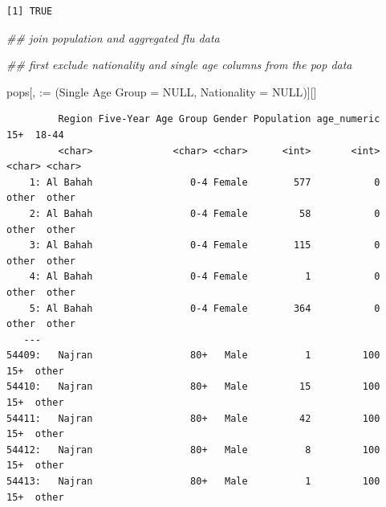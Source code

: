 \documentclass[
  letterpaper,
  DIV=11,
  numbers=noendperiod]{scrreprt}
\newenvironment{Shaded}{\begin{snugshade}}{\end{snugshade}}
\newcommand{\AttributeTok}[1]{\textcolor[rgb]{0.40,0.45,0.13}{#1}}
\newcommand{\ConstantTok}[1]{\textcolor[rgb]{0.56,0.35,0.01}{#1}}
\newcommand{\DocumentationTok}[1]{\textcolor[rgb]{0.37,0.37,0.37}{\textit{#1}}}
\newcommand{\ErrorTok}[1]{\textcolor[rgb]{0.68,0.00,0.00}{#1}}
\newcommand{\FunctionTok}[1]{\textcolor[rgb]{0.28,0.35,0.67}{#1}}
\newcommand{\NormalTok}[1]{\textcolor[rgb]{0.00,0.23,0.31}{#1}}
\newcommand{\OtherTok}[1]{\textcolor[rgb]{0.00,0.23,0.31}{#1}}
\newcommand{\SpecialCharTok}[1]{\textcolor[rgb]{0.37,0.37,0.37}{#1}}
\newcommand{\StringTok}[1]{\textcolor[rgb]{0.13,0.47,0.30}{#1}}
\begin{document}
\begin{verbatim}
[1] TRUE
\end{verbatim}

\begin{Shaded}
\begin{Highlighting}[]
\DocumentationTok{\#\# join population and aggregated flu data}

\DocumentationTok{\#\# first exclude nationality and single age columns from the pop data}

\NormalTok{pops[, }\StringTok{\textasciigrave{}}\AttributeTok{:=}\StringTok{\textasciigrave{}}\NormalTok{ (}\StringTok{\textasciigrave{}}\AttributeTok{Single Age Group}\StringTok{\textasciigrave{}} \OtherTok{=} \ConstantTok{NULL}\NormalTok{, }\AttributeTok{Nationality =} \ConstantTok{NULL}\NormalTok{)][]}
\end{Highlighting}
\end{Shaded}

\begin{verbatim}
         Region Five-Year Age Group Gender Population age_numeric    15+  18-44
         <char>              <char> <char>      <int>       <int> <char> <char>
    1: Al Bahah                 0-4 Female        577           0  other  other
    2: Al Bahah                 0-4 Female         58           0  other  other
    3: Al Bahah                 0-4 Female        115           0  other  other
    4: Al Bahah                 0-4 Female          1           0  other  other
    5: Al Bahah                 0-4 Female        364           0  other  other
   ---                                                                         
54409:   Najran                 80+   Male          1         100    15+  other
54410:   Najran                 80+   Male         15         100    15+  other
54411:   Najran                 80+   Male         42         100    15+  other
54412:   Najran                 80+   Male          8         100    15+  other
54413:   Najran                 80+   Male          1         100    15+  other
\end{verbatim}

\begin{Shaded}
\end{Shaded}
\end{document}
